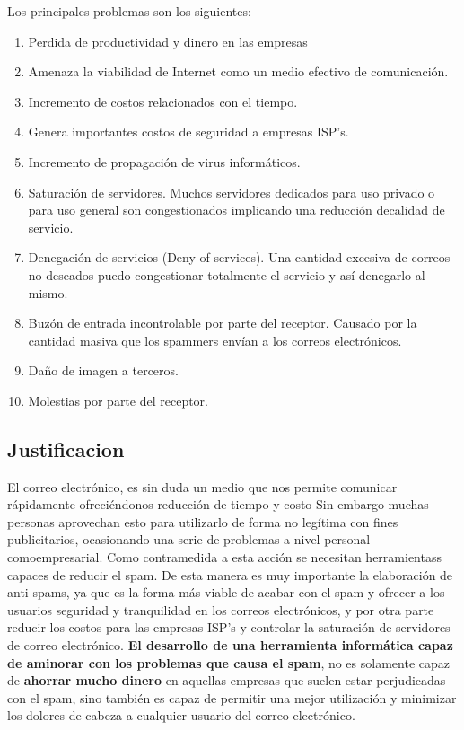 \documentclass[12pt]{article}
\begin{document}
Los principales problemas son los siguientes:
\begin{enumerate}
\item Perdida de productividad y dinero en las empresas
\item Amenaza la viabilidad de Internet como un medio efectivo de comunicación.
\item Incremento de costos relacionados con el tiempo.
\item Genera importantes costos de seguridad a empresas ISP’s.
\item Incremento de propagación de virus informáticos.
\item Saturación de servidores. Muchos servidores
dedicados para uso privado o para uso general son
congestionados implicando una reducción decalidad
de servicio.
\item Denegación de servicios (Deny of services). Una
cantidad excesiva de correos no deseados puedo
congestionar totalmente el servicio y así denegarlo al
mismo.
\item Buzón de entrada incontrolable por parte del
receptor. Causado por la cantidad masiva que los
spammers envían a los correos electrónicos.
\item Daño de imagen a terceros.
\item Molestias por parte del receptor.
\end{enumerate}

\subsection{Justificacion}
El correo electrónico, es sin duda un medio
que nos permite comunicar rápidamente ofreciéndonos reducción de tiempo y costo Sin
embargo muchas personas aprovechan esto para
utilizarlo de forma no legítima con fines publicitarios,
ocasionando una serie de problemas a
nivel personal comoempresarial.
Como contramedida a esta acción se
necesitan herramientass capaces de reducir el spam.
De esta manera es muy importante la
elaboración de anti-spams, ya que es la forma más
viable de acabar con el spam y ofrecer a los
usuarios seguridad y tranquilidad en los correos
electrónicos, y por otra parte reducir los costos para
las empresas ISP’s y controlar la saturación
de servidores de correo electrónico.
\textbf{El desarrollo de una
herramienta informática capaz de aminorar con los
problemas que causa el spam}, no es solamente capaz
de \textbf{ahorrar mucho dinero} en aquellas empresas que
suelen estar perjudicadas con el spam, sino también es
capaz de permitir una mejor utilización y minimizar
los dolores de cabeza a cualquier usuario del correo
electrónico.\cite{emailspam}
\end{document}

